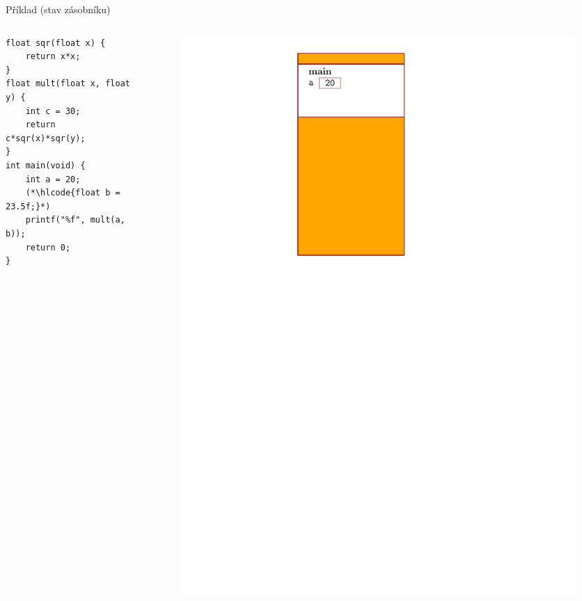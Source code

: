 \documentclass[14pt,aspectratio=169]{beamer}
\begin{document}
    \begin{frame}[t,fragile]{Příklad (stav zásobníku)}
        \begin{columns}[onlytextwidth]
            \begin{column}{0.55\textwidth}
                \begin{lstlisting}
float sqr(float x) {
    return x*x;
}
float mult(float x, float y) {
    int c = 30;
    return c*sqr(x)*sqr(y);
}
int main(void) {
    int a = 20;
    (*\hlcode{float b = 23.5f;}*)
    printf("%f", mult(a, b));
    return 0;
}
                \end{lstlisting}
            \end{column}
            \begin{column}{0.4\textwidth}
                \begin{figure}
                    \centering
                    \includegraphics[scale=.6]{images/zasobnik_stav_2.pdf}
                \end{figure}
            \end{column}
        \end{columns}
    \end{frame}
\end{document}
